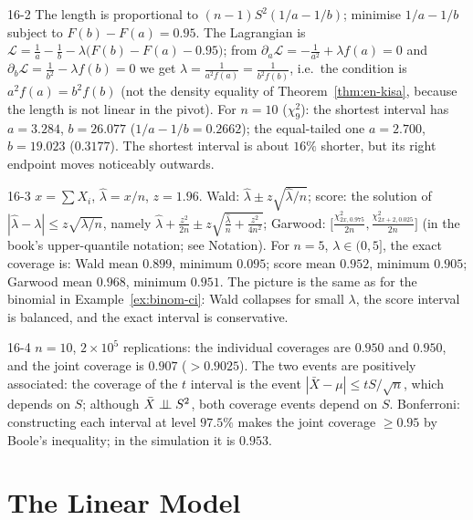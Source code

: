 \begin{solution}{16-2}
The length is proportional to $(n-1)S^2(1/a-1/b)$; minimise $1/a-1/b$ subject to $F(b)-F(a)=0.95$. The Lagrangian is $\mathcal L=\frac1a-\frac1b-\lambda\big(F(b)-F(a)-0.95\big)$; from $\partial_a\mathcal L=-\frac{1}{a^2}+\lambda f(a)=0$ and $\partial_b\mathcal L=\frac{1}{b^2}-\lambda f(b)=0$ we get $\lambda=\frac{1}{a^2f(a)}=\frac{1}{b^2f(b)}$, i.e.\ the condition is $a^2f(a)=b^2f(b)$ (not the density equality of Theorem~\ref{thm:en-kisa}, because the length is not linear in the pivot). For $n=10$ ($\chi^2_9$): the shortest interval has $a=3.284$, $b=26.077$ ($1/a-1/b=0.2662$); the equal-tailed one $a=2.700$, $b=19.023$ ($0.3177$). The shortest interval is about $16\%$ shorter, but its right endpoint moves noticeably outwards.
\end{solution}

\begin{solution}{16-3}
$x=\sum X_i$, $\hat\lambda=x/n$, $z=1.96$. Wald: $\hat\lambda\pm z\sqrt{\hat\lambda/n}$; score: the solution of $|\hat\lambda-\lambda|\le z\sqrt{\lambda/n}$, namely $\hat\lambda+\frac{z^2}{2n}\pm z\sqrt{\frac{\hat\lambda}{n}+\frac{z^2}{4n^2}}$; Garwood: $\big[\frac{\chi^2_{2x,0.975}}{2n},\frac{\chi^2_{2x+2,0.025}}{2n}\big]$ (in the book's upper-quantile notation; see Notation). For $n=5$, $\lambda\in(0,5]$, the exact coverage is:
Wald mean $0.899$, minimum $0.095$; score mean $0.952$, minimum $0.905$; Garwood mean $0.968$, minimum $0.951$. The picture is the same as for the binomial in Example~\ref{ex:binom-ci}: Wald collapses for small $\lambda$, the score interval is balanced, and the exact interval is conservative.
\end{solution}

\begin{solution}{16-4}
$n=10$, $2\times10^5$ replications: the individual coverages are $0.950$ and $0.950$, and the joint coverage is $0.907$ ($>0.9025$). The two events are positively associated: the coverage of the $t$ interval is the event $|\bar X-\mu|\le tS/\sqrt n$, which depends on $S$; although $\bar X\perp\!\!\!\perp S^2$, both coverage events depend on $S$. Bonferroni: constructing each interval at level $97.5\%$ makes the joint coverage $\ge0.95$ by Boole's inequality; in the simulation it is $0.953$.
\end{solution}

\section{The Linear Model}

